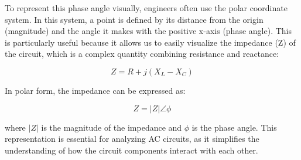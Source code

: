 To represent this phase angle visually, engineers often use the polar coordinate system. In this system, a point is defined by its distance from the origin (magnitude) and the angle it makes with the positive x-axis (phase angle). This is particularly useful because it allows us to easily visualize the impedance (Z) of the circuit, which is a complex quantity combining resistance and reactance:

\[
Z = R + j(X_L - X_C)
\]

In polar form, the impedance can be expressed as:

\[
Z = |Z| \angle \phi
\]

where \(|Z|\) is the magnitude of the impedance and \(\phi\) is the phase angle. This representation is essential for analyzing AC circuits, as it simplifies the understanding of how the circuit components interact with each other.

